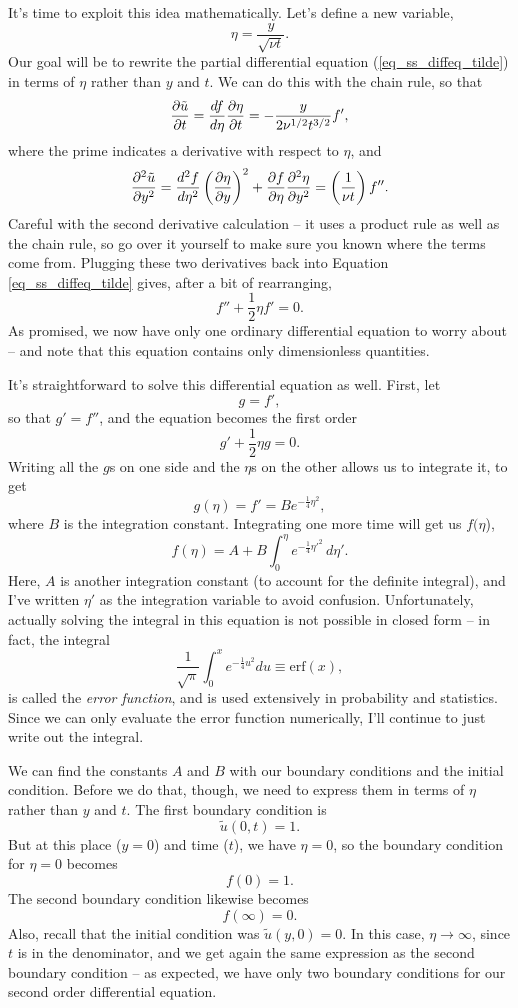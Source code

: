 It's time to exploit this idea mathematically.  Let's define a new variable,
\begin{equation}
\eta = \frac{y}{\sqrt{\nu t}}.
\end{equation}
Our goal will be to rewrite the partial differential equation (\ref{eq_ss_diffeq_tilde}) in terms of $\eta$ rather than $y$ and $t$.  We can do this with the chain rule, so that
\[
\frac{\partial {\tilde{u}}}{\partial {t}} = \frac{df}{d\eta} \frac{\partial {\eta}}{\partial {t}} = -\frac{y}{2 \nu^{1/2} t^{3/2}} f',
\]
where the prime indicates a derivative with respect to $\eta$, and
\[
\frac{\partial^2 {\tilde{u}}}{\partial {y}^2} = \frac{d^2 f}{d\eta^2} \left( \frac{\partial {\eta}}{\partial {y}} \right)^2 + \frac{\partial {f}}{\partial {\eta}} \frac{\partial^2 {\eta}}{\partial {y}^2} = \left( \frac{1}{\nu t} \right) f''.
\]
Careful with the second derivative calculation -- it uses a product rule as well as the chain rule, so go over it yourself to make sure you known where the terms come from.  Plugging these two derivatives back into Equation \ref{eq_ss_diffeq_tilde} gives, after a bit of rearranging,
\begin{equation}
f'' + \frac{1}{2} \eta f' = 0.
\end{equation}
As promised, we now have only one ordinary differential equation to worry about -- and note that this equation contains only dimensionless quantities.

It's straightforward to solve this differential equation as well.  First, let
\[
g = f',
\]
so that $g' = f''$, and the equation becomes the first order
\[
g' + \frac{1}{2} \eta g = 0.
\]
Writing all the $g$s on one side and the $\eta$s on the other allows us to integrate it, to get
\[
g(\eta) = f' = B e^{-\tfrac{1}{4} \eta^2},
\]
where $B$ is the integration constant.  Integrating one more time will get us $f(\eta$),
\[
f(\eta) = A + B \int_0^\eta e^{-\tfrac{1}{4} \eta'^2} \, d\eta'.
\]
Here, $A$ is another integration constant (to account for the definite integral), and I've written $\eta'$ as the integration variable to avoid confusion.  Unfortunately, actually solving the integral in this equation is not possible in closed form -- in fact, the integral
\[
\frac{1}{\sqrt{\pi}} \int_0^x e^{-\tfrac{1}{4} u^2} du \equiv \text{erf}(x),
\]
is called the \emph{error function}, and is used extensively in probability and statistics.  Since we can only evaluate the error function numerically, I'll continue to just write out the integral.

We can find the constants $A$ and $B$ with our boundary conditions and the initial condition.  Before we do that, though, we need to express them in terms of $\eta$ rather than $y$ and $t$.  The first boundary condition is
\[
\tilde{u}(0, t) = 1.
\]
But at this place ($y=0$) and time ($t$), we have $\eta = 0$,  so the boundary condition for $\eta=0$ becomes
\[
f(0) = 1.
\]
The second boundary condition likewise becomes
\[
f(\infty) = 0.
\]
Also, recall that the initial condition was $\tilde{u}(y, 0) = 0$.  In this case, $\eta \to \infty$, since $t$ is in the denominator, and we get again the same expression as the second boundary condition -- as expected, we have only two boundary conditions for our second order differential equation.

